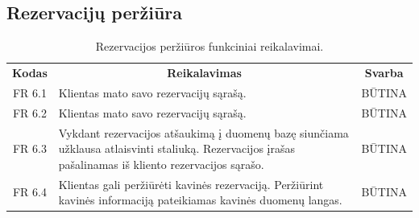 \documentclass{VUMIFPSkursinis}
\begin{document}
\pagebreak

\subsection{Rezervacijų peržiūra}
\begin{center}
	\begin{table}[H]
	\caption{Rezervacijos peržiūros funkciniai reikalavimai.}
	\begin{tabular}{|p{2cm}|p{}|p{}|}
	
	\hline
	    \rowcolor{lightgray}
		\multicolumn{3}{|c|}{Rezervacijų priežiūra}\\
		
	\hline
		\multicolumn{1}{|c|}{{\bfseries Kodas}}&
		\multicolumn{1}{|c|}{{\bfseries Reikalavimas}}&
		\multicolumn{1}{|c|}{{\bfseries Svarba}}\\

	\hline
	
		\multicolumn{1}{|c|}{FR 6.1}&
		{Klientas mato savo rezervacijų sąrašą.}&
		\multicolumn{1}{|c|}{BŪTINA}\\				
	\hline
	
		\multicolumn{1}{|c|}{FR 6.2}&
		{Klientas mato savo rezervacijų sąrašą.}&
		\multicolumn{1}{|c|}{BŪTINA}\\				
	\hline
	
		\multicolumn{1}{|c|}{FR 6.3}&
		{Vykdant rezervacijos atšaukimą į duomenų bazę siunčiama užklausa atlaisvinti staliuką. Rezervacijos įrašas pašalinamas iš kliento rezervacijos sąrašo.}&
		\multicolumn{1}{|c|}{BŪTINA}\\				
	\hline
	
		\multicolumn{1}{|c|}{FR 6.4}&
		{Klientas gali peržiūrėti kavinės rezervaciją. Peržiūrint kavinės informaciją pateikiamas kavinės duomenų langas.}&
		\multicolumn{1}{|c|}{BŪTINA}\\				
	\hline		
	
	\end{tabular}		
	
	\label{tabel:RezervacijosPeržiūra}
	\end{table}


\end{center}
\end{document}
